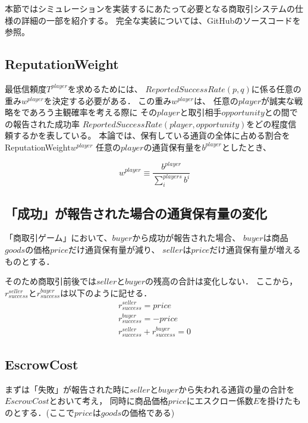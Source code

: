 本節ではシミュレーションを実装するにあたって必要となる商取引システムの仕様の詳細の一部を紹介する。
完全な実装については、GitHubのソースコードを参照。

\subsection{ReputationWeight}
最低信頼度$ T^{player} $を求めるためには、
$ ReportedSuccessRate(p, q) $に係る任意の重み$ w^{player} $を決定する必要がある．
この重み$ w^{player} $は、
任意の$ player $が誠実な戦略をであろう主観確率を考える際に
その$ player $と取引相手$ opportunity $との間での報告された成功率
$ ReportedSuccessRate(player, opportunity) $をどの程度信頼するかを表している。
本論では、保有している通貨の全体に占める割合をReputationWeight$ w^{player} $
任意の$player$の通貨保有量を$ b^{player} $としたとき、

\begin{equation*}
  w^{player} \equiv \frac{b^{player}}{\sum^{players}_{i}b^{i}}
\end{equation*}

\subsection{「成功」が報告された場合の通貨保有量の変化}
「商取引ゲーム」において、$buyer$から成功が報告された場合、
$ buyer $は商品$ goods $の価格$ price $だけ通貨保有量が減り、
$ seller $は$ price $だけ通貨保有量が増えるものとする．

そのため商取引前後では$ seller $と$ buyer $の残高の合計は変化しない．
ここから，$ r^{seller}_{success} $と$ r^{buyer}_{success} $は以下のように記せる．\\

\begin{gather*}
  r^{seller}_{success} = price \\
  r^{buyer}_{success} = -price \\
  r^{seller}_{success} + r^{buyer}_{success} = 0
\end{gather*}


\subsection{EscrowCost}
まずは「失敗」が報告された時に$ seller $と$ buyer $から失われる通貨の量の合計を$ EscrowCost $とおいて考え，
同時に商品価格$ price $にエスクロー係数$ E $を掛けたものとする．(ここで$ price $は$ goods $の価格である) \\

